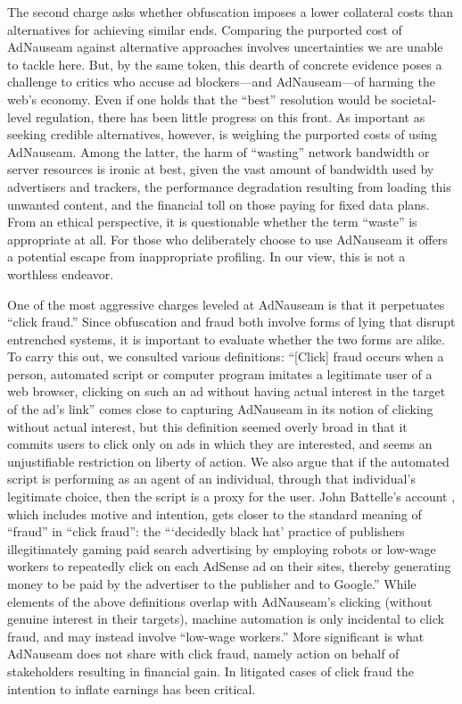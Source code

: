 \documentclass[conference]{IEEEtran}
\begin{document}
The second charge asks whether obfuscation imposes a lower collateral costs than alternatives for achieving similar ends. Comparing the purported cost of AdNauseam against alternative approaches involves uncertainties we are unable to tackle here. But, by the same token, this dearth of concrete evidence poses a challenge to critics who accuse ad blockers---and AdNauseam---of harming the web's economy. Even if one holds that the “best” resolution would be societal-level regulation, there has been little progress on this front. As important as seeking credible alternatives, however, is weighing the purported costs of using AdNauseam. Among the latter, the harm of “wasting” network bandwidth or server resources is ironic at best, given the vast amount of bandwidth used by advertisers and trackers, the performance degradation resulting from loading this unwanted content, and the financial toll on those paying for fixed data plans. From an ethical perspective, it is questionable whether the term “waste” is appropriate at all. For those who deliberately choose to use AdNauseam it offers a potential escape from inappropriate profiling. In our view, this is not a worthless endeavor.

One of the most aggressive charges leveled at AdNauseam is that it perpetuates “click fraud.” Since obfuscation and fraud both involve forms of lying that disrupt entrenched systems, it is important to evaluate whether the two forms are alike. To carry this out, we consulted various definitions: “[Click] fraud occurs when a person, automated script or computer program imitates a legitimate user of a web browser, clicking on such an ad without having actual interest in the target of the ad's link” \cite{Liu} comes close to capturing AdNauseam in its notion of clicking without actual interest, but this definition seemed overly broad in that it commits users to click only on ads in which they are interested, and seems an unjustifiable restriction on liberty of action. We also argue that if the automated script is performing as an agent of an individual, through that individual's legitimate choice, then the script is a proxy for the user. John Battelle's account \cite{Battelle}, which includes motive and intention, gets closer to the standard meaning of “fraud” in “click fraud”: the “‘decidedly black hat’ practice of publishers illegitimately gaming paid search advertising by employing robots or low-wage workers to repeatedly click on each AdSense ad on their sites, thereby generating money to be paid by the advertiser to the publisher and to Google.” While elements of the above definitions overlap with AdNauseam's clicking (without genuine interest in their targets), machine automation is only incidental to click fraud, and may instead involve “low-wage workers.” More significant is what AdNauseam does not share with click fraud, namely action on behalf of stakeholders resulting in financial gain. In litigated cases of click fraud the intention to inflate earnings has been critical.
\end{document}

